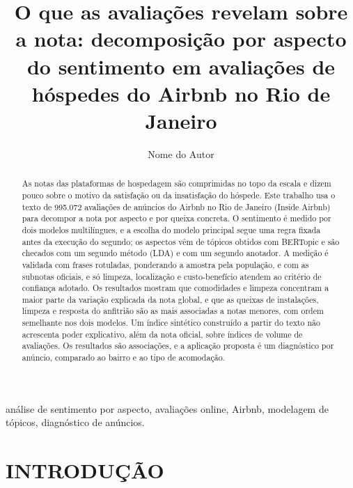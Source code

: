 \documentclass[oneside,a4paper,portuguese,links]{EngUCP}
\title{O que as avaliações revelam sobre a nota: decomposição por aspecto do sentimento em avaliações de hóspedes do Airbnb no Rio de Janeiro}
\author[1]{Nome do Autor}      %
\affil[1]{Programa de Mestrado Profissional, Universidade Católica de Petrópolis, Petrópolis, RJ, Brasil}
\begin{document}
\vspace{3cm}
\maketitle

\let\oldthefootnote\thefootnote
\renewcommand{\thefootnote}{\fnsymbol{footnote}}
\let\thefootnote\oldthefootnote

\begin{keywords}
análise de sentimento por aspecto, avaliações online, Airbnb, modelagem de tópicos, diagnóstico de anúncios.
\end{keywords}

\begin{abstract}
As notas das plataformas de hospedagem são comprimidas no topo da escala e dizem pouco sobre o motivo da satisfação ou da insatisfação do hóspede.
Este trabalho usa o texto de 995.072 avaliações de anúncios do Airbnb no Rio de Janeiro (Inside Airbnb) para decompor a nota por aspecto e por queixa concreta.
O sentimento é medido por dois modelos multilíngues, e a escolha do modelo principal segue uma regra fixada antes da execução do segundo; os aspectos vêm de tópicos obtidos com BERTopic e são checados com um segundo método (LDA) e com um segundo anotador.
A medição é validada com frases rotuladas, ponderando a amostra pela população, e com as subnotas oficiais, e só limpeza, localização e custo-benefício atendem ao critério de confiança adotado.
Os resultados mostram que comodidades e limpeza concentram a maior parte da variação explicada da nota global, e que as queixas de instalações, limpeza e resposta do anfitrião são as mais associadas a notas menores, com ordem semelhante nos dois modelos.
Um índice sintético construído a partir do texto não acrescenta poder explicativo, além da nota oficial, sobre índices de volume de avaliações.
Os resultados são associações, e a aplicação proposta é um diagnóstico por anúncio, comparado ao bairro e ao tipo de acomodação.
\end{abstract}

\section{INTRODUÇÃO}
\end{document}
